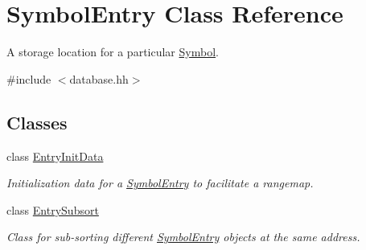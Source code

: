 \hypertarget{class_symbol_entry}{}\section{Symbol\+Entry Class Reference}
\label{class_symbol_entry}


A storage location for a particular \mbox{\hyperlink{class_symbol}{Symbol}}.  




{\ttfamily \#include $<$database.\+hh$>$}

\subsection*{Classes}
\begin{DoxyCompactItemize}
\item 
class \mbox{\hyperlink{class_symbol_entry_1_1_entry_init_data}{Entry\+Init\+Data}}
\begin{DoxyCompactList}\small\item\em Initialization data for a \mbox{\hyperlink{class_symbol_entry}{Symbol\+Entry}} to facilitate a rangemap. \end{DoxyCompactList}\item 
class \mbox{\hyperlink{class_symbol_entry_1_1_entry_subsort}{Entry\+Subsort}}
\begin{DoxyCompactList}\small\item\em Class for sub-\/sorting different \mbox{\hyperlink{class_symbol_entry}{Symbol\+Entry}} objects at the same address. \end{DoxyCompactList}\end{DoxyCompactItemize}
